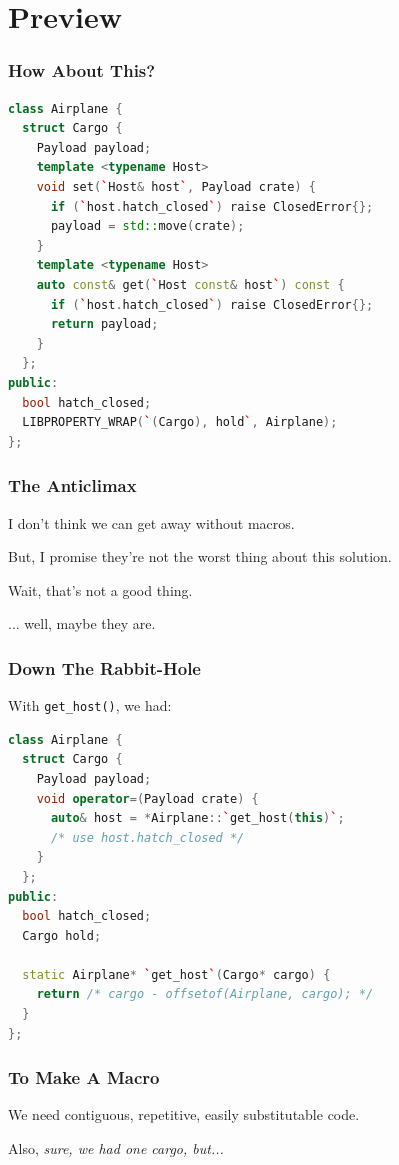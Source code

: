 \documentclass{beamer}
\def\code#1{\texttt{#1}}
\newcommand{\nl}{\vspace{0.2\baselineskip}}
\begin{document}
\section{Preview}
\begin{frame}[fragile]
\frametitle{How About This?}
\begin{lstlisting}[language=cpp]
class Airplane {
  struct Cargo {
    Payload payload;
    template <typename Host>
    void set(`Host& host`, Payload crate) {
      if (`host.hatch_closed`) raise ClosedError{};
      payload = std::move(crate);
    }
    template <typename Host>
    auto const& get(`Host const& host`) const {
      if (`host.hatch_closed`) raise ClosedError{};
      return payload;
    }
  };
public:
  bool hatch_closed;
  LIBPROPERTY_WRAP(`(Cargo), hold`, Airplane);
};
\end{lstlisting}
\end{frame}


\begin{frame}
  \frametitle{The Anticlimax}
\begin{center}
  I don't think we can get away without macros. \nl \nl \pause

  But, I promise they're not the worst thing about this solution. \nl \nl \pause

  Wait, that's not a good thing. \nl \nl \nl \nl \nl \pause

  ... well, maybe they are.
\end{center}
\end{frame}


\begin{frame}[fragile]
\frametitle{Down The Rabbit-Hole}
\begin{center}
  With \code{get\_host()}, we had:
\end{center}
\begin{lstlisting}[language=cpp]
class Airplane {
  struct Cargo {
    Payload payload;
    void operator=(Payload crate) {
      auto& host = *Airplane::`get_host(this)`;
      /* use host.hatch_closed */
    }
  };
public:
  bool hatch_closed;
  Cargo hold;

  static Airplane* `get_host`(Cargo* cargo) {
    return /* cargo - offsetof(Airplane, cargo); */
  }
};
\end{lstlisting}
\end{frame}


\begin{frame}
  \frametitle{To Make A Macro}
\begin{center}
  We need contiguous, repetitive, easily substitutable code.\nl\nl

  Also, \emph{sure, we had one cargo, but...}
\end{center}
\end{frame}
\end{document}
